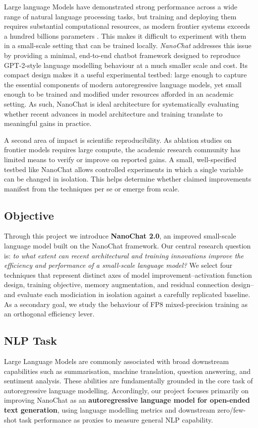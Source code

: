 Large language Models have demonstrated strong performance across a wide range of natural language processing tasks, but training and deploying them requires substantial computational
resources, as modern frontier systems exceeds a hundred billions parameters
\parencite{deepseekai2025deepseekv3technicalreport}.
This makes it difficult to experiment with them in a small-scale setting that can be trained locally.
\textit{NanoChat} \parencite{nanochat} addresses this issue by providing a minimal, end-to-end chatbot framework designed to reproduce GPT-2-style language modelling behaviour at a much smaller scale and cost.
Its compact design makes it a useful experimental testbed: large enough to capture the essential components of modern autoregressive language models, yet small enough to be trained and modified under resources afforded in an academic setting. As such, NanoChat is ideal architecture for systematically evaluating whether recent advances in  model architecture and training translate to meaningful gains in practice.

A second area of impact is scientific reproducibility. As ablation studies on frontier models requires large compute, the academic research community has limited means to verify or improve on reported gains. A small, well-specified testbed like NanoChat allows controlled experiments in which a single
variable can be changed in isolation. This helps determine whether claimed improvements manifest from the techniques per se or emerge from scale.

\subsection{Objective}

Through this project we introduce \textbf{NanoChat 2.0}, an improved small-scale language model built on the NanoChat framework.
Our central research question is: \textit{to what extent can recent architectural and training innovations improve the efficiency and performance of a small-scale language model?}
We select four techniques that represent distinct axes of model improvement--activation function
design, training objective, memory augmentation, and residual connection design--and evaluate each modiciation in isolation against a carefully replicated baseline.
As a secondary goal, we study the behaviour of FP8 mixed-precision training as an orthogonal efficiency lever.

\subsection{NLP Task}

Large Language Models are commonly associated with broad downstream capabilities such as summarisation, machine translation, question answering, and sentiment analysis. These abilities are fundamentally grounded in the core task of autoregressive language modelling. Accordingly, our project focuses primarily on improving NanoChat as an \textbf{autoregressive language model for open-ended text generation}, using language modelling metrics and downstream
zero/few-shot task performance as proxies to measure general NLP capability.
